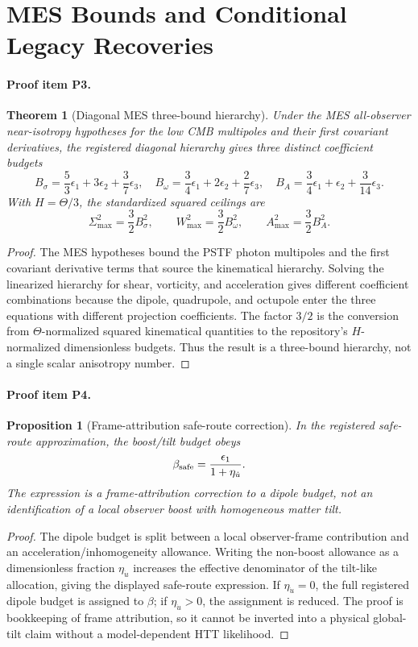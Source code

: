\documentclass[11pt]{article}
\newtheorem{proposition}{Proposition}
\newtheorem{theorem}{Theorem}
\begin{document}
\section{MES Bounds and Conditional Legacy Recoveries}
\paragraph{Proof item P3.}
\begin{theorem}[Diagonal MES three-bound hierarchy]
Under the MES all-observer near-isotropy hypotheses for the low CMB multipoles and their first covariant derivatives, the registered diagonal hierarchy gives three distinct coefficient budgets
\[
  B_\sigma=\frac53\epsilon_1+3\epsilon_2+\frac37\epsilon_3,
  \quad
  B_\omega=\frac34\epsilon_1+2\epsilon_2+\frac27\epsilon_3,
  \quad
  B_A=\frac34\epsilon_1+\epsilon_2+\frac3{14}\epsilon_3 .
\]
With \(H=\Theta/3\), the standardized squared ceilings are
\[
  \Sigma^2_{\max}=\frac32B_\sigma^2,
  \qquad
  W^2_{\max}=\frac32B_\omega^2,
  \qquad
  A^2_{\max}=\frac32B_A^2 .
\]
\end{theorem}
\begin{proof}
The MES hypotheses bound the PSTF photon multipoles and the first covariant derivative terms that source the kinematical hierarchy.  Solving the linearized hierarchy for shear, vorticity, and acceleration gives different coefficient combinations because the dipole, quadrupole, and octupole enter the three equations with different projection coefficients.  The factor \(3/2\) is the conversion from \(\Theta\)-normalized squared kinematical quantities to the repository's \(H\)-normalized dimensionless budgets.  Thus the result is a three-bound hierarchy, not a single scalar anisotropy number.
\end{proof}

\paragraph{Proof item P4.}
\begin{proposition}[Frame-attribution safe-route correction]
In the registered safe-route approximation, the boost/tilt budget obeys
\[
  \beta_{\rm safe}=\frac{\epsilon_1}{1+\eta_{\dot u}} .
\]
The expression is a frame-attribution correction to a dipole budget, not an identification of a local observer boost with homogeneous matter tilt.
\end{proposition}
\begin{proof}
The dipole budget is split between a local observer-frame contribution and an acceleration/inhomogeneity allowance.  Writing the non-boost allowance as a dimensionless fraction \(\eta_{\dot u}\) increases the effective denominator of the tilt-like allocation, giving the displayed safe-route expression.  If \(\eta_{\dot u}=0\), the full registered dipole budget is assigned to \(\beta\); if \(\eta_{\dot u}>0\), the assignment is reduced.  The proof is bookkeeping of frame attribution, so it cannot be inverted into a physical global-tilt claim without a model-dependent HTT likelihood.
\end{proof}
\end{document}
